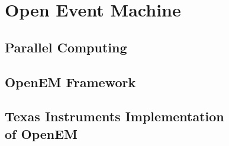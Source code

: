 \chapter{Open Event Machine}
\label{chapter:openem}


\section{Parallel Computing}
\label{sec:event-processing}


\section{OpenEM Framework}
\label{sec:emframework}


\section[Texas Instruments Implementation of OpenEM]{Texas Instruments Implementation\\of OpenEM}
\label{sec:tiopenem}

